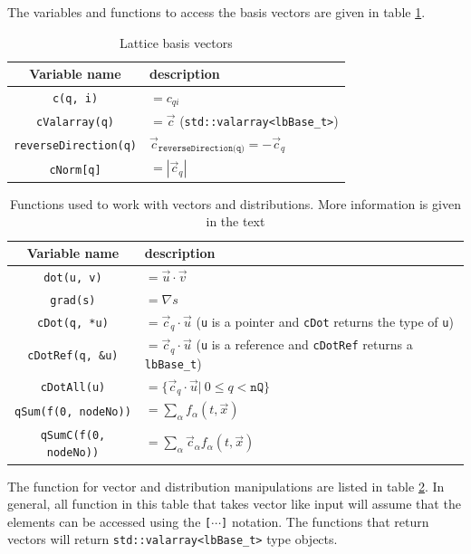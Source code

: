 \documentclass[11pt,a4paper]{report}
\begin{document}
The variables and functions to access the basis vectors are given in table \ref{tab:lattice basis vector}.
\begin{table}
	\centering
	\begin{tabular}{|c|l|}\hline
		Variable name & description \\ \hline
		\texttt{c(q, i)} & $=c_{qi}$ \\ 
		\texttt{cValarray(q)} & $=\vec{c}$ (\texttt{std::valarray<lbBase{\_t}>}) \\ 		
		\texttt{reverseDirection(q)} & $\vec{c}_{\texttt{reverseDirection(q)}} = -\vec{c}_{q}$ \\ \hline 
		\texttt{cNorm[q]} & $=|\vec{c}_q|$ \\ \hline
	\end{tabular}
	\caption{Lattice basis vectors}
	\label{tab:lattice basis vector}
\end{table}

\begin{table}
	\centering
	\begin{tabular}{|c|l|}\hline
		Variable name & description \\ \hline
		\texttt{dot(u, v)} & $=\vec{u}\cdot\vec{v}$ \\ 
		\texttt{grad(s)} & $=\nabla s$ \\ \hline
		\texttt{cDot(q, *u)} & $=\vec{c}_q\cdot\vec{u}$ (\texttt{u} is a pointer and \texttt{cDot} returns the type of \texttt{u})\\ 
		\texttt{cDotRef(q, \&u)} & $=\vec{c}_q\cdot\vec{u}$ (\texttt{u} is a reference and \texttt{cDotRef} returns a \texttt{lbBase{\_}t})\\ 
		\texttt{cDotAll(u)} & $=\{\vec{c}_q\cdot\vec{u}|\ 0\leq q < \texttt{nQ}\}$ \\ \hline
		\texttt{qSum(f(0, nodeNo))} & $=\sum_\alpha f_\alpha(t, \vec{x})$ \\
		\texttt{qSumC(f(0, nodeNo))} & $=\sum_\alpha \vec{c}_\alpha f_\alpha(t, \vec{x})$ \\ \hline
	\end{tabular}
	\caption{Functions used to work with vectors and distributions. More information is given in the text}
	\label{tab:vector and distribution functions}
\end{table}
The function for vector and distribution manipulations are listed in table \ref{tab:vector and distribution functions}. In general, all function in this table that takes vector like input will assume that the elements can be accessed using the \texttt{[$\cdots$]} notation. The functions that return vectors will return \texttt{std::valarray<lbBase\_t>} type objects.
\end{document}
